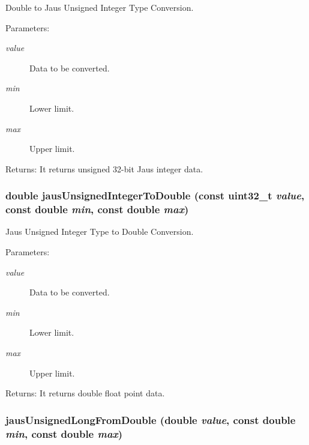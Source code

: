 Double to Jaus Unsigned Integer Type Conversion. 

\begin{Desc}
\item[Parameters:]
\begin{description}
\item[{\em value}]Data to be converted. \item[{\em min}]Lower limit. \item[{\em max}]Upper limit.\end{description}
\end{Desc}
\begin{Desc}
\item[Returns:]It returns unsigned 32-bit Jaus integer data. \end{Desc}
\hypertarget{group__data__conv_gedb727422eafd1cbcb9497109016314d}{
\subsubsection[jausUnsignedIntegerToDouble]{\setlength{\rightskip}{0pt plus 5cm}double jausUnsignedIntegerToDouble (const {\bf uint32\_\-t} {\em value}, \/  const double {\em min}, \/  const double {\em max})}}
\label{group__data__conv_gedb727422eafd1cbcb9497109016314d}


Jaus Unsigned Integer Type to Double Conversion. 

\begin{Desc}
\item[Parameters:]
\begin{description}
\item[{\em value}]Data to be converted. \item[{\em min}]Lower limit. \item[{\em max}]Upper limit.\end{description}
\end{Desc}
\begin{Desc}
\item[Returns:]It returns double float point data. \end{Desc}
\hypertarget{group__data__conv_g3aa19ded70d7987e9fdf46fc09696e76}{
\subsubsection[jausUnsignedLongFromDouble]{ jausUnsignedLongFromDouble (double {\em value}, \/  const double {\em min}, \/  const double {\em max})}}
\label{group__data__conv_g3aa19ded70d7987e9fdf46fc09696e76}


